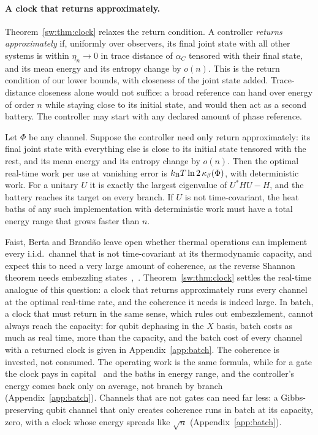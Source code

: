\paragraph{A clock that returns approximately.} Theorem~\ref{sw:thm:clock} relaxes the return condition. A controller \emph{returns approximately} if, uniformly over observers, its final joint state with all other systems is within $\eta_n\to0$ in trace distance of $\alpha_C$ tensored with their final state, and its mean energy and its entropy change by $o(n)$. This is the return condition of our lower bounds, with closeness of the joint state added. Trace-distance closeness alone would not suffice: a broad reference can hand over energy of order $n$ while staying close to its initial state, and would then act as a second battery. The controller may start with any declared amount of phase reference.

\begin{theorem}\label{sw:thm:clock}
Let $\Phi$ be any channel. Suppose the controller need only return approximately: its final joint state with everything else is close to its initial state tensored with the rest, and its mean energy and its entropy change by $o(n)$. Then the optimal real-time work per use at vanishing error is $k_{\mathrm B} T\ln2\,\kappa_\beta(\Phi)$, with deterministic work. For a unitary $U$ it is exactly the largest eigenvalue of $U^*HU-H$, and the battery reaches its target on every branch. If $U$ is not time-covariant, the heat baths of any such implementation with deterministic work must have a total energy range that grows faster than $n$.
\end{theorem}

Faist, Berta and Brand\~ao leave open whether thermal operations can implement every i.i.d.\ channel that is not time-covariant at its thermodynamic capacity, and expect this to need a very large amount of coherence, as the reverse Shannon theorem needs embezzling states~\cite{FBB19},~\cite[Sec.~9]{FBB21}. Theorem~\ref{sw:thm:clock} settles the real-time analogue of this question: a clock that returns approximately runs every channel at the optimal real-time rate, and the coherence it needs is indeed large. In batch, a clock that must return in the same sense, which rules out embezzlement, cannot always reach the capacity: for qubit dephasing in the $X$ basis, batch costs as much as real time, more than the capacity, and the batch cost of every channel with a returned clock is given in Appendix~\ref{app:batch}. The coherence is invested, not consumed. The operating work is the same formula, while for a gate the clock pays in capital~\cite{ChiribellaYangRenner21,TSS20} and the baths in energy range, and the controller's energy comes back only on average, not branch by branch (Appendix~\ref{app:batch}). Channels that are not gates can need far less: a Gibbs-preserving qubit channel that only creates coherence runs in batch at its capacity, zero, with a clock whose energy spreads like $\sqrt n$ (Appendix~\ref{app:batch}).

